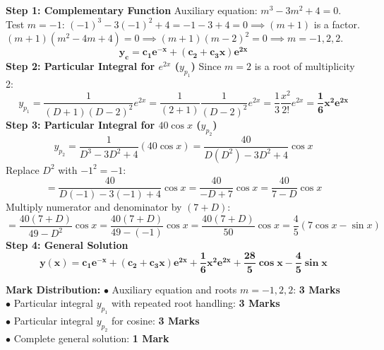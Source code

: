 \begin{solutionbox}
\textbf{Step 1: Complementary Function}
Auxiliary equation: $m^3 - 3m^2 + 4 = 0$.
Test $m = -1$: $(-1)^3 - 3(-1)^2 + 4 = -1 - 3 + 4 = 0 \implies (m+1)$ is a factor.
$(m+1)(m^2 - 4m + 4) = 0 \implies (m+1)(m-2)^2 = 0 \implies m = -1, 2, 2$.
\[
\mathbf{y_c = c_1 e^{-x} + (c_2 + c_3 x)e^{2x}}
\]
\textbf{Step 2: Particular Integral for $e^{2x}$ ($y_{p_1}$)}
Since $m = 2$ is a root of multiplicity 2:
\[
y_{p_1} = \frac{1}{(D+1)(D-2)^2} e^{2x} = \frac{1}{(2+1)} \frac{1}{(D-2)^2} e^{2x} = \frac{1}{3} \frac{x^2}{2!} e^{2x} = \mathbf{\frac{1}{6} x^2 e^{2x}}
\]
\textbf{Step 3: Particular Integral for $40 \cos x$ ($y_{p_2}$)}
\[
y_{p_2} = \frac{1}{D^3 - 3D^2 + 4} (40 \cos x) = \frac{40}{D(D^2) - 3D^2 + 4} \cos x
\]
Replace $D^2$ with $-1^2 = -1$:
\[
= \frac{40}{D(-1) - 3(-1) + 4} \cos x = \frac{40}{-D + 7} \cos x = \frac{40}{7 - D} \cos x
\]
Multiply numerator and denominator by $(7 + D)$:
\[
= \frac{40(7 + D)}{49 - D^2} \cos x = \frac{40(7 + D)}{49 - (-1)} \cos x = \frac{40(7 + D)}{50} \cos x = \frac{4}{5}(7\cos x - \sin x)
\]
\textbf{Step 4: General Solution}
\[
\mathbf{y(x) = c_1 e^{-x} + (c_2 + c_3 x)e^{2x} + \frac{1}{6} x^2 e^{2x} + \frac{28}{5}\cos x - \frac{4}{5}\sin x}
\]

\begin{markingrubric}
\textbf{Mark Distribution:}
$\bullet$ Auxiliary equation and roots $m = -1, 2, 2$: \textbf{3 Marks}\\
$\bullet$ Particular integral $y_{p_1}$ with repeated root handling: \textbf{3 Marks}\\
$\bullet$ Particular integral $y_{p_2}$ for cosine: \textbf{3 Marks}\\
$\bullet$ Complete general solution: \textbf{1 Mark}
\end{markingrubric}
\end{solutionbox}

